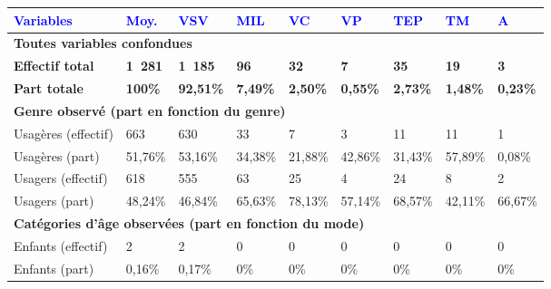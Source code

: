         \begin{longtable}{p{3.7cm}p{0.9cm}p{0.9cm}p{0.9cm}p{0.9cm}p{0.9cm}p{0.9cm}p{0.9cm}p{0.9cm}}
         \textcolor{blue}{\textbf{Variables}} & \textcolor{blue}{\textbf{Moy.}} & \textcolor{blue}{\textbf{VSV}} & \textcolor{blue}{\textbf{MIL}} & \textcolor{blue}{\textbf{VC}} & \textcolor{blue}{\textbf{VP}} & \textcolor{blue}{\textbf{TEP}} & \textcolor{blue}{\textbf{TM}} & \textcolor{blue}{\textbf{A}}\\
        \hline
        \endhead   
\multicolumn{9}{l}{\textbf{Toutes variables confondues}}\\
    \small{\textbf{Effectif total}} & \small{\textbf{1~281}} & \small{\textbf{1~185}} & \small{\textbf{96}} & \small{\textbf{32}} & \small{\textbf{7}} & \small{\textbf{35}} & \small{\textbf{19}} & \small{\textbf{3}}\\
    \small{\textbf{Part totale}} & \small{\textbf{100\%}} & \small{\textbf{92,51\%}} & \small{\textbf{7,49\%}} & \small{\textbf{2,50\%}} & \small{\textbf{0,55\%}} & \small{\textbf{2,73\%}} & \small{\textbf{1,48\%}} & \small{\textbf{0,23\%}}\\
    \hline
\multicolumn{9}{l}{\textbf{Genre observé (part en fonction du genre)}}\\
    \small{Usagères (effectif)} & \small{663} & \small{630} & \small{33} & \small{7} & \small{3} & \small{11} & \small{11} & \small{1}\\
    \small{Usagères (part)} & \small{51,76\%} & \small{53,16\%} & \small{34,38\%} & \small{21,88\%} & \small{42,86\%} & \small{31,43\%} & \small{57,89\%} & \small{0,08\%}\\
    \small{Usagers (effectif)} & \small{618} & \small{555} & \small{63} & \small{25} & \small{4} & \small{24} & \small{8} & \small{2}\\
    \small{Usagers (part)} & \small{48,24\%} & \small{46,84\%} & \small{65,63\%} & \small{78,13\%} & \small{57,14\%} & \small{68,57\%} & \small{42,11\%} & \small{66,67\%}\\
    \hline
\multicolumn{9}{l}{\textbf{Catégories d'âge observées (part en fonction du mode)}}\\
    \small{Enfants (effectif)} & \small{2} & \small{2} & \small{0} & \small{0} & \small{0} & \small{0} & \small{0} & \small{0}\\
    \small{Enfants (part)} & \small{0,16\%} & \small{0,17\%} & \small{0\%} & \small{0\%} & \small{0\%} & \small{0\%} & \small{0\%} & \small{0\%}\\

\end{longtable}
